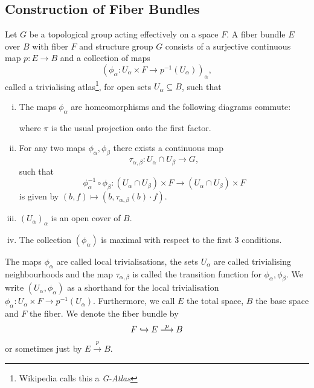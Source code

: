 \subsection{Construction of Fiber Bundles}

\begin{definition}
    \label{fiber_bundles:def:fiber_bundle}
    Let $G$ be a topological group acting effectively on a space $F$. A fiber bundle $E$ over $B$ with fiber $F$ and structure group $G$ consists of a surjective continuous map $p \colon E \to B$ and a collection of maps 
    \[
    (\phi_\alpha \colon U_\alpha \times F \to p^{-1}(U_\alpha))_\alpha,
    \]
    called a trivialising atlas\footnote{Wikipedia calls this a \textit{G-Atlas}}, for open sets $U_\alpha \subseteq B$, such that 
    \begin{enumerate}[(i)]
        \item The maps $\phi_\alpha$ are homeomorphisms and the following diagrams commute:
        \begin{center}
        \end{center}
        where $\pi$ is the usual projection onto the first factor.
        \item For any two maps $\phi_\alpha, \phi_\beta$ there exists a continuous map
        \[
        \tau_{\alpha,\beta} \colon U_\alpha \cap U_\beta \to G,
        \]
        such that
        \[
        \phi_\alpha^{-1} \circ \phi_\beta \colon (U_\alpha \cap U_\beta) \times F \to (U_\alpha \cap U_\beta) \times F
        \]
        is given by $(b,f) \mapsto (b,\tau_{\alpha,\beta}(b) \cdot f)$.
        \item $(U_\alpha)_\alpha$ is an open cover of $B$.
        \item The collection $(\phi_\alpha)$ is maximal with respect to the first 3 conditions.
    \end{enumerate}
    The maps $\phi_\alpha$ are called local trivialisations,  the sets $U_\alpha$ are called trivialising neighbourhoods and the map $\tau_{\alpha,\beta}$ is called the transition function for $\phi_\alpha,\phi_\beta$. We write $(U_\alpha,\phi_\alpha)$ as a shorthand for the local trivialisation $\phi_\alpha \colon U_\alpha \times F \to p^{-1}(U_\alpha)$. Furthermore, we call $E$ the total space, $B$ the base space and $F$ the fiber. We denote the fiber bundle by
    \[
    F \hookrightarrow E \oset[0.5pt]{\scalebox{0.8}{$p$}}{\longrightarrow} B
    \]
    or sometimes just by $E \xrightarrow{p} B$.  
\end{definition}

